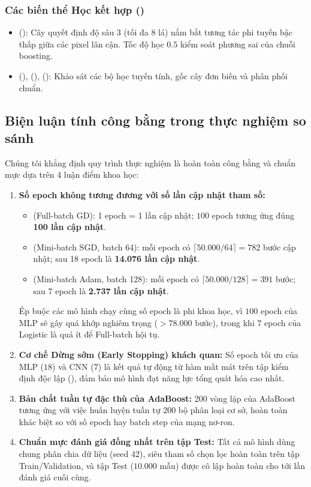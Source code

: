 \subsubsection{Các biến thể Học kết hợp ()}
\begin{itemize}
    \item {} (): Cây quyết định độ sâu 3 (tối đa 8 lá) nắm bắt tương tác phi tuyến bậc thấp giữa các pixel lân cận. Tốc độ học $0.5$ kiểm soát phương sai của chuỗi boosting.
    \item {} (),  (),  (): Khảo sát các bộ học tuyến tính, gốc cây đơn biến và phân phối chuẩn.
\end{itemize}

\subsection{Biện luận tính công bằng trong thực nghiệm so sánh}
Chúng tôi khẳng định quy trình thực nghiệm là hoàn toàn công bằng và chuẩn mực dựa trên 4 luận điểm khoa học:

\begin{enumerate}
    \item \textbf{Số epoch không tương đương với số lần cập nhật tham số:}
    \begin{itemize}
        \item {} (Full-batch GD): 1 epoch = 1 lần cập nhật; $100$ epoch tương ứng đúng \textbf{100 lần cập nhật}.
        \item {} (Mini-batch SGD, batch 64): mỗi epoch có $\lceil 50.000 / 64 \rceil = 782$ bước cập nhật; sau 18 epoch là \textbf{14.076 lần cập nhật}.
        \item {} (Mini-batch Adam, batch 128): mỗi epoch có $\lceil 50.000 / 128 \rceil = 391$ bước; sau 7 epoch là \textbf{2.737 lần cập nhật}.
    \end{itemize}
    Ép buộc các mô hình chạy cùng số epoch là phi khoa học, vì $100$ epoch của MLP sẽ gây quá khớp nghiêm trọng ($>78.000$ bước), trong khi $7$ epoch của Logistic là quá ít để Full-batch hội tụ.
    \item \textbf{Cơ chế Dừng sớm (Early Stopping) khách quan:} Số epoch tối ưu của MLP ($18$) và CNN ($7$) là kết quả tự động từ hàm mất mát trên tập kiểm định độc lập (), đảm bảo mô hình đạt năng lực tổng quát hóa cao nhất.
    \item \textbf{Bản chất tuần tự đặc thù của AdaBoost:} 200 vòng lặp của AdaBoost tương ứng với việc huấn luyện tuần tự 200 bộ phân loại cơ sở, hoàn toàn khác biệt so với số epoch hay batch step của mạng nơ-ron.
    \item \textbf{Chuẩn mực đánh giá đồng nhất trên tập Test:} Tất cả mô hình dùng chung phân chia dữ liệu (seed 42), siêu tham số chọn lọc hoàn toàn trên tập Train/Validation, và tập Test ($10.000$ mẫu) được cô lập hoàn toàn cho tới lần đánh giá cuối cùng.
\end{enumerate}
